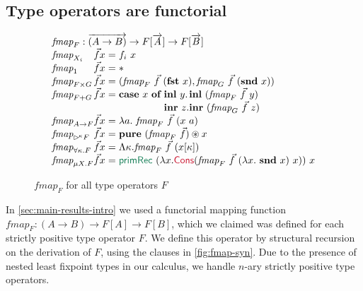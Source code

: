 \documentclass[natbib]{sigplanconf}
\newcommand{\cons}[1]{\textcolor{cons}{\textsf{#1}}}
\newcommand{\elim}[1]{\textcolor{elim}{\textsf{#1}}}
\newcommand{\kw}[1]{\textbf{#1}}
\newcommand{\ident}[1]{\textit{#1}}
\newcommand{\delayX}[1]{\mathord{\rhd\kern-0.1em^{#1}}}
\begin{document}
\subsection{Type operators are functorial}
\label{sec:functorial}

\newcommand{\ora}[1]{\overrightarrow{#1}}

\begin{figure}[t]
  \centering
\begin{displaymath}
  \begin{array}{l@{}c@{}c@{}c@{}c@{}l}
    \ident{fmap}_F : \overrightarrow{(A \to B)} \to F[\overrightarrow{A}] \to F[\overrightarrow{B}] \\
    \begin{array}{@{}l@{}l@{}l@{\hspace{0.3em}}c@{\hspace{0.3em}}l}
    \ident{fmap}_{X_i}&\vec{f}&x & = & f_i~x \\
    \ident{fmap}_1    &\vec{f}&x & = & * \\
    \ident{fmap}_{F \times G}&\vec{f}&x & = & (\ident{fmap}_F~\vec{f}~(\kw{fst}~x), \ident{fmap}_G~\vec{f}~(\kw{snd}~x)) \\
    \ident{fmap}_{F + G}&\vec{f}&x & = & \kw{case}~x~\kw{of}~
    \begin{array}[t]{@{}l@{}l}
      \kw{inl}~y. & \kw{inl}~(\ident{fmap}_F~\vec{f}~y) \\
      \kw{inr}~z. & \kw{inr}~(\ident{fmap}_G~\vec{f}~z)
    \end{array}\\
    \ident{fmap}_{A\to F}&\vec{f}&x&=&\lambda a.~\ident{fmap}_F~\vec{f}~(x~a) \\
    \ident{fmap}_{\delayX\kappa F}&\vec{f}&x&=&\kw{pure}~(\ident{fmap}_F~\vec{f}) \circledast x \\
    \ident{fmap}_{\forall\kappa.F}&\vec{f}&x&=&\Lambda \kappa. \ident{fmap}_F~\vec{f}~(x[\kappa]) \\
    \ident{fmap}_{\mu X. F}&\vec{f}&x&=&\elim{primRec}~(\lambda x. \cons{Cons}(\ident{fmap}_F~\vec{f}~(\lambda x.~\kw{snd}~x)~x))~x      
    \end{array}
  \end{array}
\end{displaymath}  
  \caption{$\ident{fmap}_F$ for all type operators $F$}
  \label{fig:fmap-syn}
\end{figure}

In \autoref{sec:main-results-intro} we used a functorial mapping
function $\ident{fmap}_F : (A \to B) \to F[A] \to F[B]$, which we
claimed was defined for each strictly positive type operator $F$. We
define this operator by structural recursion on the derivation of $F$,
using the clauses in \autoref{fig:fmap-syn}. Due to the presence of
nested least fixpoint types in our calculus, we handle $n$-ary
strictly positive type operators.
\end{document}
